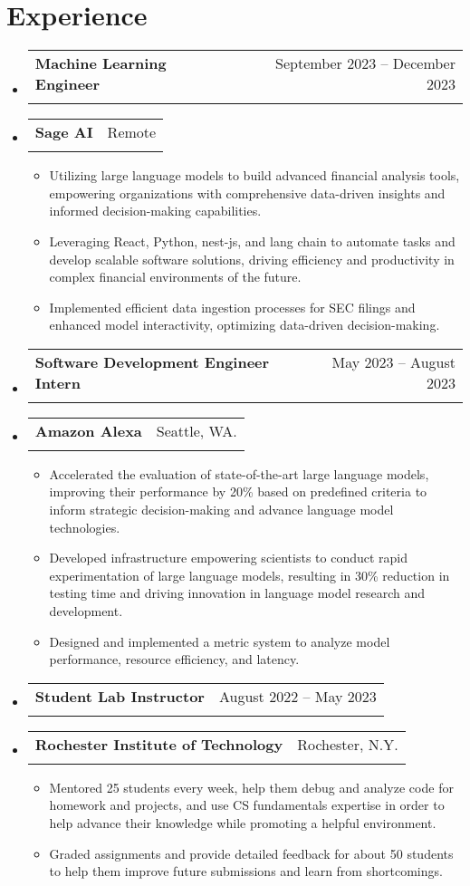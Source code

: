 \documentclass{article}
\makeatletter
\newcommand{\resumeItem}[1]{
  \item\small{
    {#1 \vspace{-2pt}}
  }
}
\newcommand{\resumeSubheading}[4]{
  \vspace{-2pt}\item
    \begin{tabular*}{0.97\textwidth}[t]{l@{\extracolsep{\fill}}r}
      \textbf{#1} & #2 \\
      \textit{\small#3} & \textit{\small #4} \\
    \end{tabular*}\vspace{-7pt}
}
\newcommand{\resumeSubHeadingListStart}{\begin{itemize}[leftmargin=0.15in, label={}]}
\newcommand{\resumeSubHeadingListEnd}{\end{itemize}}
\newcommand{\resumeItemListStart}{\begin{itemize}}
\newcommand{\resumeItemListEnd}{\end{itemize}\vspace{-5pt}}
\makeatother
\begin{document}
\section{Experience}
\resumeSubHeadingListStart
\resumeSubheading
{Machine Learning Engineer}{September 2023 -- December 2023}
{\vspace{-20pt}}{\vspace{-20pt}}
\vspace{-10pt}
\resumeSubheading
{Sage AI}{Remote}
{}{}
\resumeItemListStart
\vspace{-10pt}
\resumeItem{Utilizing large language models to build advanced financial analysis tools, empowering organizations with comprehensive data-driven insights and informed decision-making capabilities.}
\resumeItem{Leveraging React, Python, nest-js, and lang chain to automate tasks and develop scalable software solutions, driving efficiency and productivity in complex financial environments of the future.}
\resumeItem{Implemented efficient data ingestion processes for SEC filings and enhanced model interactivity, optimizing data-driven decision-making.}
\resumeItemListEnd
\resumeSubHeadingListEnd

\resumeSubHeadingListStart
\resumeSubheading 
{Software Development Engineer Intern}{May 2023 -- August 2023}
{\vspace{-20pt}}{\vspace{-20pt}}
\vspace{-10pt}
\resumeSubheading
{Amazon Alexa}{Seattle, WA.}
{}{}
\resumeItemListStart
\vspace{-10pt}
\resumeItem{Accelerated the evaluation of state-of-the-art large language models, improving their performance by 20\% based on predefined criteria to inform strategic decision-making and advance language model technologies.}
\resumeItem{Developed infrastructure empowering scientists to conduct rapid experimentation of large language models, resulting in 30\% reduction in testing time and driving innovation in language model research and development.}
\resumeItem{Designed and implemented a metric system to analyze model performance, resource efficiency, and latency.}
\resumeItemListEnd
\resumeSubHeadingListEnd

\resumeSubHeadingListStart
\resumeSubheading
{Student Lab Instructor}{August 2022 -- May 2023}
{\vspace{-20pt}}{\vspace{-20pt}}
\vspace{-10pt}
\resumeSubheading
{Rochester Institute of Technology}{Rochester, N.Y.}
{}{}
\resumeItemListStart
\vspace{-10pt}
\resumeItem{Mentored 25 students every week, help them debug and analyze code for homework and projects, and use CS fundamentals expertise in order to help advance their knowledge while promoting a helpful environment.}
\resumeItem{Graded assignments and provide detailed feedback for about 50 students to help them improve future submissions and learn from shortcomings.}
\resumeItemListEnd
\resumeSubHeadingListEnd
\end{document}

